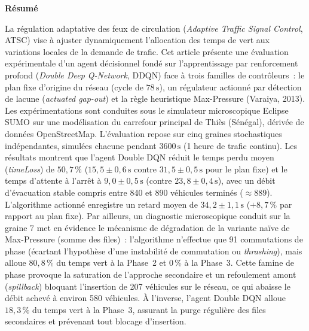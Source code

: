 \documentclass[10pt,twocolumn,letterpaper]{article}
\begin{document}

\begin{center}
\textbf{\large Résumé}
\end{center}

La régulation adaptative des feux de circulation (\emph{Adaptive Traffic Signal Control}, ATSC) vise à ajuster dynamiquement l'allocation des temps de vert aux variations locales de la demande de trafic. Cet article présente une évaluation expérimentale d'un agent décisionnel fondé sur l'apprentissage par renforcement profond (\emph{Double Deep Q-Network}, DDQN) face à trois familles de contrôleurs~: le plan fixe d'origine du réseau (cycle de $78\,\mathrm{s}$), un régulateur actionné par détection de lacune (\emph{actuated gap-out}) et la règle heuristique Max-Pressure (Varaiya, 2013). Les expérimentations sont conduites sous le simulateur microscopique Eclipse SUMO sur une modélisation du carrefour principal de Thiès (Sénégal), dérivée de données OpenStreetMap. L'évaluation repose sur cinq graines stochastiques indépendantes, simulées chacune pendant $3600\,\mathrm{s}$ (1 heure de trafic continu). Les résultats montrent que l'agent Double DQN réduit le temps perdu moyen (\emph{timeLoss}) de $50{,}7\,\%$ ($15{,}5 \pm 0{,}6\,\mathrm{s}$ contre $31{,}5 \pm 0{,}5\,\mathrm{s}$ pour le plan fixe) et le temps d'attente à l'arrêt à $9{,}0 \pm 0{,}5\,\mathrm{s}$ (contre $23{,}8 \pm 0{,}4\,\mathrm{s}$), avec un débit d'évacuation stable compris entre 840 et 890 véhicules terminés ($\approx 889$). L'algorithme actionné enregistre un retard moyen de $34{,}2 \pm 1{,}1\,\mathrm{s}$ ($+8{,}7\,\%$ par rapport au plan fixe). Par ailleurs, un diagnostic microscopique conduit sur la graine 7 met en évidence le mécanisme de dégradation de la variante naïve de Max-Pressure (somme des files)~: l'algorithme n'effectue que 91 commutations de phase (écartant l'hypothèse d'une instabilité de commutation ou \emph{thrashing}), mais alloue $80{,}8\,\%$ du temps vert à la Phase~2 et $0\,\%$ à la Phase~3. Cette famine de phase provoque la saturation de l'approche secondaire et un refoulement amont (\emph{spillback}) bloquant l'insertion de 207 véhicules sur le réseau, ce qui abaisse le débit achevé à environ 580 véhicules. À l'inverse, l'agent Double DQN alloue $18{,}3\,\%$ du temps vert à la Phase~3, assurant la purge régulière des files secondaires et prévenant tout blocage d'insertion.
\end{document}
